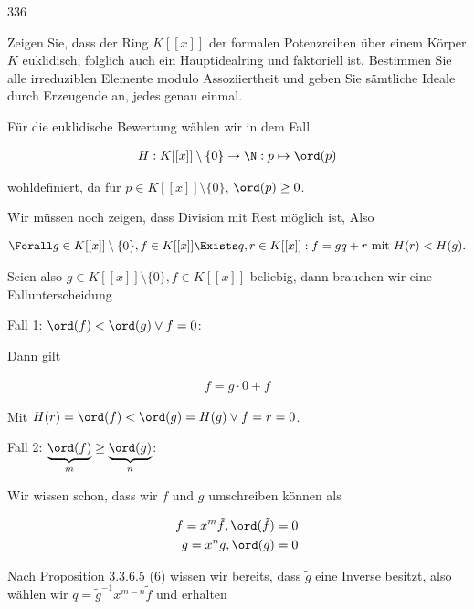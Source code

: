 \begin{algebraUE}{336}

Zeigen Sie, dass der Ring $K[[x]]$ der formalen Potenzreihen über einem Körper $K$ euklidisch, folglich auch ein Hauptidealring und faktoriell ist. Bestimmen Sie alle irreduziblen Elemente modulo Assoziiertheit und geben Sie sämtliche Ideale durch Erzeugende an, jedes genau einmal.

\end{algebraUE}

\begin{solution}

Für die euklidische Bewertung wählen wir in dem Fall

\begin{align*}
  H:K[[x]] \setminus \{0\} \to \N: p \mapsto \ord(p)
\end{align*}

wohldefiniert, da für $p \in K[[x]] \setminus \{0\}$, $\ord(p) \geq 0$.

Wir müssen noch zeigen, dass Division mit Rest möglich ist, Also

\begin{align*}
  \Forall g \in K[[x]] \setminus \{0\}, f \in K[[x]] \Exists q,r \in K[[x]]: f = gq + r \text{~mit~} H(r) < H(g).
\end{align*}

Seien also $g \in K[[x]] \setminus \{0\}, f \in K[[x]]$ beliebig, dann brauchen wir eine Fallunterscheidung

Fall 1: $\ord(f) < \ord(g) \lor f = 0$:

Dann gilt

\begin{align*}
  f = g \cdot 0 + f
\end{align*}

Mit $H(r) = \ord(f) < \ord(g) = H(g) \lor f = r = 0$.

Fall 2: $\underbrace{\ord(f)}_{m} \geq \underbrace{\ord(g)}_{n}$:

Wir wissen schon, dass wir $f$ und $g$ umschreiben können als

\begin{align*}
  f = x^m\tilde{f}, \ord(\tilde{f}) = 0 \\
  g = x^n\tilde{g}, \ord(\tilde{g}) = 0
\end{align*}

Nach Proposition 3.3.6.5 (6) wissen wir bereits, dass $\tilde{g}$ eine Inverse besitzt, also wählen wir $q = \tilde{g}^{-1}x^{m-n}\tilde{f}$ und erhalten


\end{solution}
